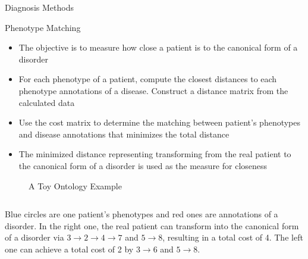 \documentclass[final]{beamer} %
\begin{document}
\begin{frame}{}
\begin{columns}[T]
\begin{column}{0.3\linewidth}
\begin{block}{\Huge Diagnosis Methods}
     \begin{block}{\Large Phenotype Matching}
       \begin{itemize}
         \Large
       \item The objective is to measure how close a patient is to the
         canonical form of a disorder \vspace{1cm}
       \item For each phenotype of a patient, compute the closest
         distances to each phenotype annotations of a
         disease. Construct a distance matrix from the calculated data
         \vspace{1cm}
       \item Use the cost matrix to determine the matching between
         patient's phenotypes and disease annotations that minimizes
         the total distance \vspace{1cm}
       \item The minimized distance representing transforming from the
         real patient to the canonical form of a disorder is used as
         the measure for closeness
       \end{itemize}
       \vspace{0.5cm}
       \begin{figure}
         \centering
         \caption{A Toy Ontology Example}
       \end{figure}
       \begin{columns}[T]
         \begin{column}{.9\textwidth}
           \large Blue circles are one patient's phenotypes and red
           ones are annotations of a disorder. In the right one, the
           real patient can transform into the canonical form of a
           disorder via $3 \rightarrow 2 \rightarrow 4 \rightarrow 7$
           and $5 \rightarrow 8$, resulting in a total cost of 4. The
           left one can achieve a total cost of 2 by $3 \rightarrow 6$
           and $5 \rightarrow 8$.
         \end{column}
       \end{columns}
   

\end{block}
\end{block}
\end{column}
\end{columns}
\end{frame}
\end{document}
